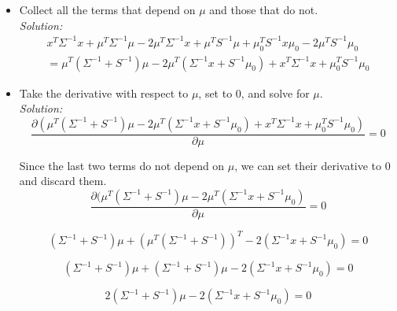 \documentclass{../amsml}
\begin{document}
\begin{problem}
\begin{itemize}
	\item Collect all the terms that depend on $\mu$ and those that do not. \\
		\emph{Solution: }  \\
			\begin{equation}
				\begin{split}
				x^T \Sigma^{-1} x + \mu^T \Sigma^{-1} \mu - 2 \mu^T \Sigma^{-1} x + \mu^T S^{-1} \mu + \mu_0^T S^{-1}x \mu_0 - 2 \mu^T S^{-1} \mu_0 \\
				= \mu^T (\Sigma^{-1} + S^{-1}) \mu - 2 \mu^T(\Sigma^{-1}x + S^{-1}\mu_0) + x^T \Sigma^{-1}x + \mu_0^T S^{-1} \mu_0  
				\end{split}
			\end{equation}
		
	\item Take the derivative with respect to $\mu$, set to 0, and solve for $\mu$. \\
		\emph{Solution: }  \\
			 \begin{equation}
				 \frac{\partial (\mu^T (\Sigma^{-1} + S^{-1}) \mu - 2 \mu^T(\Sigma^{-1}x + S^{-1}\mu_0) + x^T \Sigma^{-1}x + \mu_0^T S^{-1} \mu_0)}{\partial \mu} = 0 
			 \end{equation}
			 
			 Since the last two terms do not depend on $\mu$, we can set their derivative to $0$ and discard them.\\
			 \begin{equation}
				 \frac{\partial (\mu^T (\Sigma^{-1} + S^{-1}) \mu - 2 \mu^T(\Sigma^{-1}x + S^{-1}\mu_0)}{\partial \mu} = 0 
			 \end{equation}
			 
			 \begin{equation}
				 (\Sigma^{-1} + S^{-1}) \mu + (\mu^T (\Sigma^{-1} + S^{-1}))^T - 2(\Sigma^{-1} x + S^{-1} \mu_0) = 0
			 \end{equation}
			 
			 \begin{equation}
				 (\Sigma^{-1} + S^{-1}) \mu + (\Sigma^{-1} + S^{-1}) \mu - 2(\Sigma^{-1} x + S^{-1} \mu_0) = 0
			 \end{equation}
			 
			 \begin{equation}
				 2(\Sigma^{-1} + S^{-1}) \mu - 2(\Sigma^{-1} x + S^{-1} \mu_0) = 0
			 \end{equation}
			 

\end{itemize}
\end{problem}
\end{document}
